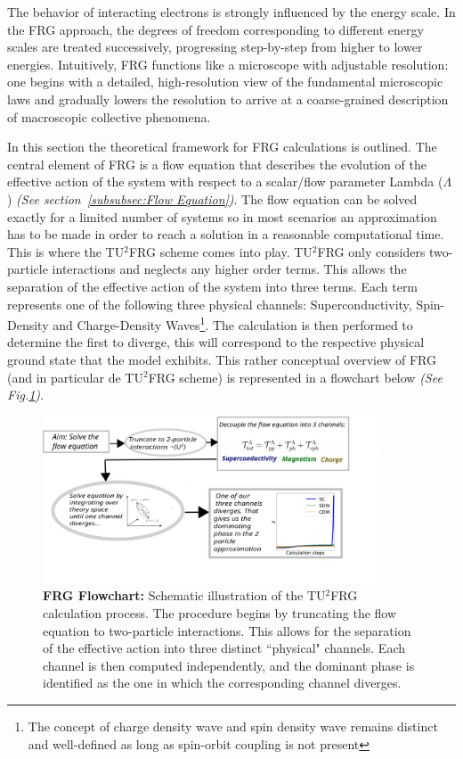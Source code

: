 \documentclass[11pt]{article}
\begin{document}
\medskip

\noindent The behavior of interacting electrons is strongly influenced by the energy scale. In the FRG approach, the degrees of freedom corresponding to different energy scales are treated successively, 
progressing step-by-step from higher to lower energies.
Intuitively, FRG functions like a microscope with adjustable resolution: one begins with a detailed, high-resolution view of the fundamental microscopic laws and gradually lowers the resolution to arrive at a coarse-grained description of macroscopic collective phenomena.
\medskip

\noindent In this section the theoretical framework for FRG calculations is outlined. The central element of FRG is a flow equation that describes the evolution of the effective action of the system with respect to a scalar/flow parameter Lambda ($\Lambda$) \textit{(See section~\ref{subsubsec:Flow Equation})}.
The flow equation can be solved exactly for a limited number of systems so in most scenarios an approximation has to be made in order to reach a solution in a reasonable computational time.  
This is where the TU$^2$FRG scheme comes into play. TU$^2$FRG only considers two-particle
interactions and neglects any higher order terms.
This allows the separation of the effective action of the system into three terms. Each term represents one of the following three physical channels: Superconductivity, Spin-Density and Charge-Density Waves\footnote{The concept of charge density wave and spin density wave remains distinct and well-defined as long as spin-orbit coupling is not present}.
The calculation is then performed to determine the first to diverge, this will correspond to the respective physical ground state that the model exhibits. This rather conceptual overview of FRG (and in particular de TU$^2$FRG scheme) is represented in a flowchart below \textit{(See Fig.\ref{fig:FRGflowdiagram})}.
 

\begin{figure}[htbp]  %
    \centering
    \includegraphics[width=0.9\textwidth]{FRGflowdiagram.png}  %
    \caption{\textbf{FRG Flowchart:} Schematic illustration of the TU$^2$FRG calculation process.
     The procedure begins by truncating the flow equation to two-particle interactions. 
     This allows for the separation of the effective action into three distinct ``physical" channels. 
     Each channel is then computed independently, and the dominant phase is identified as the 
     one in which the corresponding channel diverges.}
    \label{fig:FRGflowdiagram}
\end{figure}
\end{document}
